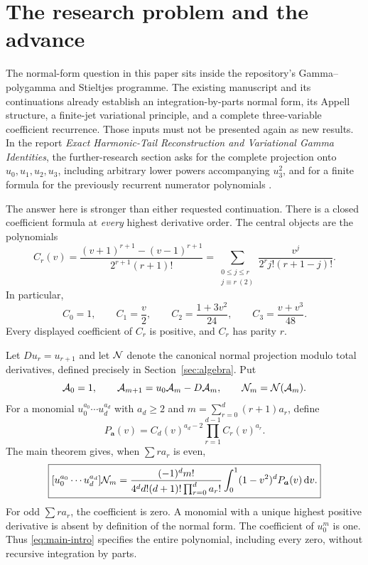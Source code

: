 \section{The research problem and the advance}
\label{sec:scope}

The normal-form question in this paper sits inside the repository's Gamma--polygamma and Stieltjes programme. The existing manuscript and its continuations already establish an integration-by-parts normal form, its Appell structure, a finite-jet variational principle, and a complete three-variable coefficient recurrence. Those inputs must not be presented again as new results. In the report \emph{Exact Harmonic-Tail Reconstruction and Variational Gamma Identities}, the further-research section asks for the complete projection onto $u_0,u_1,u_2,u_3$, including arbitrary lower powers accompanying $u_3^2$, and for a finite formula for the previously recurrent numerator polynomials \cite{RepoSector,RepoQuestions}.

The answer here is stronger than either requested continuation. There is a closed coefficient formula at \emph{every} highest derivative order. The central objects are the polynomials
\begin{equation}\label{eq:Cr}
 C_r(v)=\frac{(v+1)^{r+1}-(v-1)^{r+1}}{2^{r+1}(r+1)!}
       =\sum_{\substack{0\le j\le r\\j\equiv r\ (2)}}
          \frac{v^j}{2^rj!(r+1-j)!}.
\end{equation}
In particular,
\[
 C_0=1,\qquad C_1=\frac v2,\qquad
 C_2=\frac{1+3v^2}{24},\qquad C_3=\frac{v+v^3}{48}.
\]
Every displayed coefficient of $C_r$ is positive, and $C_r$ has parity $r$.

Let $D u_r=u_{r+1}$ and let $\mathcal N$ denote the canonical normal projection modulo total derivatives, defined precisely in Section~\ref{sec:algebra}. Put
\begin{equation}\label{eq:hierarchy-intro}
 \mathcal A_0=1,\qquad \mathcal A_{m+1}=u_0\mathcal A_m-D\mathcal A_m,
 \qquad \mathcal N_m=\mathcal N(\mathcal A_m).
\end{equation}
For a monomial $u_0^{a_0}\cdots u_d^{a_d}$ with $a_d\ge2$ and
$m=\sum_{r=0}^d(r+1)a_r$, define
\[
 P_{\boldsymbol a}(v)=C_d(v)^{a_d-2}
                    \prod_{r=1}^{d-1}C_r(v)^{a_r}.
\]
The main theorem gives, when $\sum r a_r$ is even,
\begin{equation}\label{eq:main-intro}
 \boxed{\displaystyle
 [u_0^{a_0}\cdots u_d^{a_d}]\mathcal N_m
 =\frac{(-1)^d m!}{4^d d!(d+1)!\prod_{r=0}^d a_r!}
       \int_0^1(1-v^2)^dP_{\boldsymbol a}(v)\,\mathrm d v.}
\end{equation}
For odd $\sum r a_r$, the coefficient is zero. A monomial with a unique highest positive derivative is absent by definition of the normal form. The coefficient of $u_0^m$ is one. Thus \eqref{eq:main-intro} specifies the entire polynomial, including every zero, without recursive integration by parts.

